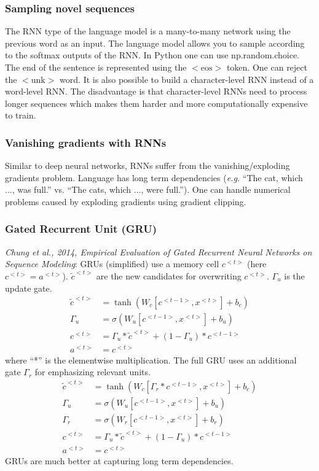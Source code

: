 \documentclass{article}
\begin{document}
\subsubsection{Sampling novel sequences}
The RNN type of the language model is a many-to-many network using the previous word as an input.
The language model allows you to sample according to the softmax outputs of the RNN.
In Python one can use np.random.choice.
The end of the sentence is represented using the $\mathrm{<eos>}$ token.
One can reject the $\mathrm{<unk>}$ word.
It is also possible to build a character-level RNN instead of a word-level RNN.
The disadvantage is that character-level RNNs need to process longer sequences which makes them harder and more computationally expensive to train.

\subsubsection{Vanishing gradients with RNNs}
Similar to deep neural networks, RNNs suffer from the vanishing/exploding gradients problem.
Language has long term dependencies (\emph{e.g.} ``The cat, which ..., was full.'' vs. ``The cats, which ..., were full.'').
One can handle numerical problems caused by exploding gradients using gradient clipping.

\subsubsection{Gated Recurrent Unit (GRU)}
\emph{Chung et al., 2014, Empirical Evaluation of Gated Recurrent Neural Networks on Sequence Modeling}:
GRUs (simplified) use a memory cell $c^{<t>}$ (here $c^{<t>}=a^{<t>}$).
$\tilde{c}^{<t>}$ are the new candidates for overwriting $c^{<t>}$.
$\Gamma_u$ is the update gate.
\begin{equation}
  \begin{split}
    \tilde{c}^{<t>}&=\tanh(W_c[c^{<t-1>},x^{<t>}]+b_c)\\
    \Gamma_u&=\sigma(W_u[c^{<t-1>},x^{<t>}]+b_u)\\
    c^{<t>}&=\Gamma_u*\tilde{c}^{<t>}+(1-\Gamma_u)*c^{<t-1>}\\
    a^{<t>}&=c^{<t>}
  \end{split}
\end{equation}
where ``*'' is the elementwise multiplication.
The full GRU uses an additional gate $\Gamma_r$ for emphasizing relevant units.
\begin{equation}
  \begin{split}
    \tilde{c}^{<t>}&=\tanh(W_c[\Gamma_r*c^{<t-1>},x^{<t>}]+b_c)\\
    \Gamma_u&=\sigma(W_u[c^{<t-1>},x^{<t>}]+b_u)\\
    \Gamma_r&=\sigma(W_r[c^{<t-1>},x^{<t>}]+b_r)\\
    c^{<t>}&=\Gamma_u*\tilde{c}^{<t>}+(1-\Gamma_u)*c^{<t-1>}\\
    a^{<t>}&=c^{<t>}
  \end{split}
\end{equation}
GRUs are much better at capturing long term dependencies.
\end{document}
